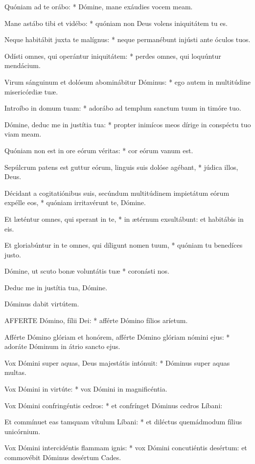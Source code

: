 Quóniam ad te orábo: * Dómine, mane exáudies vocem meam.

Mane astábo tibi et vidébo: * quóniam non Deus volens iniquitátem tu es.

Neque habitábit juxta te malígnus: * neque permanébunt injústi ante óculos tuos.

Odísti omnes, qui operántur iniquitátem: * perdes omnes, qui loquúntur mendácium.

Virum sánguinum et dolósum abominábitur Dóminus: * ego autem in multitúdine misericórdiæ tuæ.

Introíbo in domum tuam: * adorábo ad templum sanctum tuum in timóre tuo.

Dómine, deduc me in justítia tua: * propter inimícos meos dírige in conspéctu tuo viam meam.

Quóniam non est in ore eórum véritas: * cor eórum vanum est.

Sepúlcrum patens est guttur eórum, linguis suis dolóse agébant, * júdica illos, Deus.

Décidant a cogitatiónibus suis, secúndum multitúdinem impietátum eórum expélle eos, * quóniam irritavérunt te, Dómine.

Et læténtur omnes, qui sperant in te, * in ætérnum exsultábunt: et habitábis in eis.

Et gloriabúntur in te omnes, qui díligunt nomen tuum, * quóniam tu benedíces justo.

Dómine, ut scuto bonæ voluntátis tuæ * coronásti nos.

 Deduc me in justítia tua, Dómine.

 Dóminus dabit virtútem.


\lettrine[lines=2]{A}{FFERTE} Dómino, fílii Dei: * afférte Dómino fílios aríetum.

Afférte Dómino glóriam et honórem, afférte Dómino glóriam nómini ejus: * adoráte Dóminum in átrio sancto ejus.

Vox Dómini super aquas, Deus majestátis intónuit: * Dóminus super aquas multas.

Vox Dómini in virtúte: * vox Dómini in magnificéntia.

Vox Dómini confringéntis cedros: * et confrínget Dóminus cedros Líbani:

Et commínuet eas tamquam vítulum Líbani: * et diléctus quemádmodum fílius unicórnium.

Vox Dómini intercidéntis flammam ignis: * vox Dómini concutiéntis desértum: et commovébit Dóminus desértum Cades.

